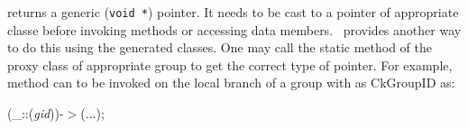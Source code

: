  returns a generic ({\tt void
*}) pointer.  It needs to be
cast to a pointer of appropriate classe before invoking methods or
accessing data members. \charmpp\ provides another way to do this using
the generated
 classes. One may call the static method
 of the proxy class of appropriate
group to get the correct type of pointer.  For
example, method  can to be invoked on the local branch of
a group  with  as CkGroupID as:

(\_::({\it gid}))-$>$(...);\\









